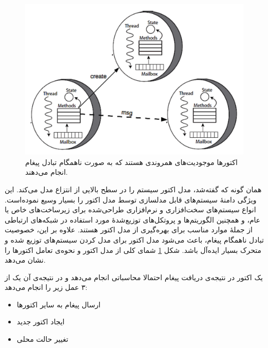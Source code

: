 \begin{figure}
    \begin{center}
	\includegraphics[width=12cm]{2-Preliminaries/Figures/Actor_Structure.pdf}
    \end{center}
    \caption{\label{fig:actorStructure} اکتور‌ها موجودیت‌های همروندی هستند که به صورت ناهمگام تبادل پیغام انجام ‌می‌دهند. }
\end{figure}


همان گونه که گفته‌شد، مدل اکتور سیستم را در سطح بالایی از انتزاع مدل می‌کند.
این ویژگی دامنهٔ سیستم‌های قابل مدلسازی توسط مدل اکتور را بسیار وسیع نموده‌است.
انواع سیستم‌های سخت‌افزاری و نرم‌افزاری طراحی‌شده برای زیرساخت‌های خاص یا عام، و همچنین الگوریتم‌ها و پروتکل‌های توزیع‌شدهٔ مورد استفاده در شبکه‌های ارتباطی از جملهٔ موارد مناسب برای بهره‌گیری از مدل اکتور هستند. علاوه بر این، خصوصیت تبادل ناهمگام پیغام، باعث می‌شود مدل اکتور برای مدل کردن سیستم‌های توزیع شده و متحرک بسیار ایده‌آل باشد\cite{KarmaniAgha_Actors_11}. شکل \ref{fig:actorStructure} شمای کلی از مدل اکتور و نحوه‌ی تعامل اکتور‌ها را نشان می‌دهد.
 
 یک اکتور در نتیجه‌ی دریافت پیغام احتمالا محاسباتی انجام می‌دهد و در نتیجه‌ی آن یک از ۳ عمل زیر را انجام می‌دهد:
\begin{itemize}
\item ارسال پیغام به سایر اکتور‌ها
\item ایجاد اکتور جدید
\item تغییر حالت محلی
\end{itemize} 

